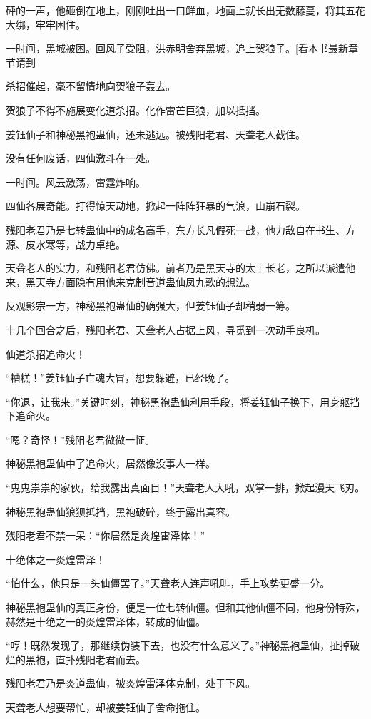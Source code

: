 \begin{this_body}
砰的一声，他砸倒在地上，刚刚吐出一口鲜血，地面上就长出无数藤蔓，将其五花大绑，牢牢困住。

一时间，黑城被困。回风子受阻，洪赤明舍弃黑城，追上贺狼子。[看本书最新章节请到

杀招催起，毫不留情地向贺狼子轰去。

贺狼子不得不施展变化道杀招。化作雷芒巨狼，加以抵挡。

姜钰仙子和神秘黑袍蛊仙，还未逃远。被残阳老君、天聋老人截住。

没有任何废话，四仙激斗在一处。

一时间。风云激荡，雷霆炸响。

四仙各展奇能。打得惊天动地，掀起一阵阵狂暴的气浪，山崩石裂。

残阳老君乃是七转蛊仙中的成名高手，东方长凡假死一战，他力敌自在书生、方源、皮水寒等，战力卓绝。

天聋老人的实力，和残阳老君仿佛。前者乃是黑天寺的太上长老，之所以派遣他来，黑天寺方面隐有用他来克制音道蛊仙凤九歌的想法。

反观影宗一方，神秘黑袍蛊仙的确强大，但姜钰仙子却稍弱一筹。

十几个回合之后，残阳老君、天聋老人占据上风，寻觅到一次动手良机。

仙道杀招追命火！

“糟糕！”姜钰仙子亡魂大冒，想要躲避，已经晚了。

“你退，让我来。”关键时刻，神秘黑袍蛊仙利用手段，将姜钰仙子换下，用身躯挡下追命火。

“嗯？奇怪！”残阳老君微微一怔。

神秘黑袍蛊仙中了追命火，居然像没事人一样。

“鬼鬼祟祟的家伙，给我露出真面目！”天聋老人大吼，双掌一排，掀起漫天飞刃。

神秘黑袍蛊仙狼狈抵挡，黑袍破碎，终于露出真容。

残阳老君不禁一呆：“你居然是炎煌雷泽体！”

十绝体之一炎煌雷泽！

“怕什么，他只是一头仙僵罢了。”天聋老人连声吼叫，手上攻势更盛一分。

神秘黑袍蛊仙的真正身份，便是一位七转仙僵。但和其他仙僵不同，他身份特殊，赫然是十绝之一的炎煌雷泽体，转成的仙僵。

“哼！既然发现了，那继续伪装下去，也没有什么意义了。”神秘黑袍蛊仙，扯掉破烂的黑袍，直扑残阳老君而去。

残阳老君乃是炎道蛊仙，被炎煌雷泽体克制，处于下风。

天聋老人想要帮忙，却被姜钰仙子舍命拖住。


\end{this_body}
